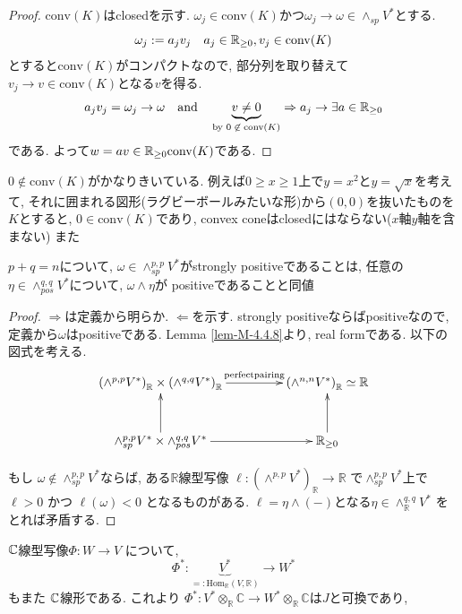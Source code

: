 \begin{proof}
$\mathrm{conv}(K)$はclosedを示す. 
$\omega_j \in \mathrm{conv}(K)$かつ$\omega_j \to \omega \in \wedge_{sp}V^*$とする. 
$$
\omega_j :=a_j v_j  \quad a_j \in \mathbb{R}_{\ge0}, v_j \in \mathrm{conv}(K)
$$
とすると$\mathrm{conv}(K)$がコンパクトなので, 部分列を取り替えて
$v_j \to v \in \mathrm{conv}(K)$となる$v$を得る.
$$
a_j v_j =\omega_j \to \omega
\quad \text{and} \quad
\underbrace{v \neq 0}_{\text{by $0 \not \in \mathrm{conv}(K)$}}
\Rightarrow 
a_j \to \exists a \in \mathbb{R}_{\ge 0}
$$
である. よって$w = av \in \mathbb{R}_{\ge 0}  \mathrm{conv}(K)$である.
\end{proof}

\begin{rem}
$0 \not \in \mathrm{conv}(K)$がかなりきいている. 
例えば$0 \ge x \ge 1$上で$y=x^2$と$y=\sqrt{x}$を考えて, それに囲まれる図形(ラグビーボールみたいな形)から$(0, 0)$を抜いたものを$K$とすると, 
$0 \in \mathrm{conv}(K)$であり, convex coneはclosedにはならない($x$軸$y$軸を含まない)
また
\end{rem}

\begin{tcolorbox}[mybox]
\begin{lem}
\label{lem-M-5.4.2}
$p+q=n$について, $\omega \in \wedge_{sp}^{p,p}V^{*}$がstrongly positiveであることは, 任意の$\eta \in \wedge_{pos}^{q,q}V^*$について, $\omega \wedge \eta$が
positiveであることと同値
\end{lem}
\end{tcolorbox}
\begin{proof}
$\Rightarrow$は定義から明らか. 
$\Leftarrow$を示す. 
strongly positiveならばpositiveなので, 定義から$\omega$はpositiveである. 
Lemma \ref{lem-M-4.4.8}より, real formである. 
以下の図式を考える.
\[
\xymatrix@C=4.5em@R=3em{
\left(\wedge^{p,p}V^*\right)_{\mathbb{R}}
\times
\left(\wedge^{q,q}V^*\right)_{\mathbb{R}}
\ar[r]^-{\mathrm{perfect pairing}}
&
\left(\wedge^{n,n}V^*\right)_{\mathbb{R}}
\simeq \mathbb{R}
\\
\wedge^{p,p}_{sp}V^*\times\wedge^{q,q}_{pos}V^*
\ar[u]
\ar[r]
&
\mathbb{R}_{\ge 0}
\ar[u]
}
\]

もし \(\omega\notin \wedge^{p,p}_{sp}V^*\)ならば,
 ある\(\mathbb{R}\)線型写像 \(\ell\colon
\left(\wedge^{p,p}V^*\right)_{\mathbb{R}}\to \mathbb{R}\)
で\(\wedge^{p,p}_{sp}V^*\)上で\(\ell>0\) かつ \(\ell(\omega)<0\)
となるものがある. 
$\ell=\eta\wedge(-)$となる$\eta\in \wedge^{q,q}_{\mathbb{R}}V^*$
をとれば矛盾する. 
\end{proof}


$\mathbb{C}$線型写像\(\Phi\colon W\to V\) について, 
\[
\Phi^*\colon \underbrace{V^*}_{=:\mathrm{Hom}_{\mathbb{R}}(V,\mathbb{R})}\longrightarrow W^*
\]
もまた
$\mathbb{C}$線形である. 
これより
\(
\Phi^*:
V^*\otimes_{\mathbb{R}}\mathbb{C}
\overset{}{\longrightarrow}
W^*\otimes_{\mathbb{R}}\mathbb{C}
\)は$J$と可換であり, 

